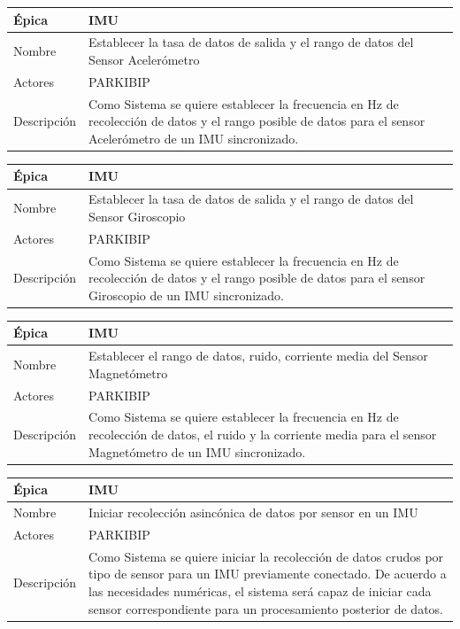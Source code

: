 \begin{table}[H] 
\centering
\begin{tabular}{| p{2cm} | p{10cm} |}
\hline
Épica & IMU\\ \hline
Nombre & Establecer la tasa de datos de salida y el rango de datos del Sensor Acelerómetro\\ \hline
Actores & PARKIBIP\\ \hline
Descripción & Como Sistema se quiere establecer la frecuencia en Hz de recolección de datos y el rango posible de datos para el sensor Acelerómetro de un IMU sincronizado.  \\ \hline
\end{tabular}
\end{table}

\begin{table}[H] 
\centering
\begin{tabular}{| p{2cm} | p{10cm} |}
\hline
Épica & IMU\\ \hline
Nombre & Establecer la tasa de datos de salida y el rango de datos del Sensor Giroscopio\\ \hline
Actores & PARKIBIP\\ \hline
Descripción & Como Sistema se quiere establecer la frecuencia en Hz de recolección de datos y el rango posible de datos para el sensor Giroscopio de un IMU sincronizado.\\ \hline
\end{tabular}
\end{table}

\begin{table}[H] 
\centering
\begin{tabular}{| p{2cm} | p{10cm} |}
\hline
Épica & IMU\\ \hline
Nombre & Establecer el rango de datos,  ruido, corriente media del Sensor Magnetómetro\\ \hline
Actores & PARKIBIP\\ \hline
Descripción & Como Sistema se quiere establecer la frecuencia en Hz de recolección de datos, el ruido y la corriente media para el sensor Magnetómetro de un IMU sincronizado.\\ \hline
\end{tabular}
\end{table}

\begin{table}[H] 
\centering
\begin{tabular}{| p{2cm} | p{10cm} |}
\hline
Épica & IMU\\ \hline
Nombre & Iniciar recolección asincónica de datos por sensor en un IMU\\ \hline
Actores & PARKIBIP\\ \hline
Descripción &  Como Sistema se quiere iniciar la recolección de datos crudos por tipo de sensor para un IMU previamente conectado. De acuerdo a las necesidades numéricas, el sistema será capaz de iniciar cada sensor correspondiente para un procesamiento posterior de datos.\\ \hline
\end{tabular} 
\end{table}

